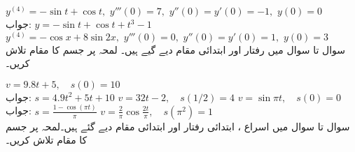 $y^{(4)}=-\sin t+\cos t,\,\, y'''(0)=7,\,\, y''(0)=y'(0)=-1,\,\, y(0)=0$\\
جواب:\quad
$y=-\sin t+\cos t+t^3-1$
$y^{(4)}=-\cos x+8\sin 2x,\,\, y'''(0)=0, \,\, y''(0)=y'(0)=1,\,\, y(0)=3$
\\
سوال  تا سوال  میں رفتار  اور ابتدائی مقام دیے گیے ہیں۔ لمحہ  پر جسم کا مقام تلاش کریں۔

$v=9.8 t+5,\quad s(0)=10$\\
جواب:\quad
$s=4.9t^2+5t+10$
$v=32 t-2,\quad s(1/2)=4$
$v=\sin \pi t,\quad s(0)=0$\\
جواب:\quad
$s=\tfrac{1-\cos (\pi t)}{\pi}$
$v=\tfrac{2}{\pi}\cos \tfrac{2t}{\pi},\quad s(\pi^2)=1$
\\
سوال  تا سوال  میں اسراع ، ابتدائی رفتار  اور ابتدائی مقام دیے گئے ہیں۔لمحہ  پر جسم کا مقام تلاش کریں۔

